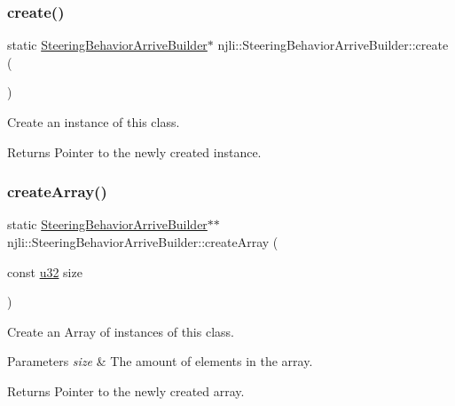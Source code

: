 \subsubsection{\texorpdfstring{create()}{create()}}
{\footnotesize\ttfamily static \mbox{\hyperlink{classnjli_1_1_steering_behavior_arrive_builder}{Steering\+Behavior\+Arrive\+Builder}}$\ast$ njli\+::\+Steering\+Behavior\+Arrive\+Builder\+::create (\begin{DoxyParamCaption}{ }\end{DoxyParamCaption})\hspace{0.3cm}{\ttfamily [static]}}

Create an instance of this class.

\begin{DoxyReturn}{Returns}
Pointer to the newly created instance. 
\end{DoxyReturn}
\mbox{\label{classnjli_1_1_steering_behavior_arrive_builder_a1e1038411d15323c3bc9e23d6aefe0c0}} 
\subsubsection{\texorpdfstring{create\+Array()}{createArray()}}
{\footnotesize\ttfamily static \mbox{\hyperlink{classnjli_1_1_steering_behavior_arrive_builder}{Steering\+Behavior\+Arrive\+Builder}}$\ast$$\ast$ njli\+::\+Steering\+Behavior\+Arrive\+Builder\+::create\+Array (\begin{DoxyParamCaption}\item[{const \mbox{\hyperlink{_util_8h_a10e94b422ef0c20dcdec20d31a1f5049}{u32}}}]{size }\end{DoxyParamCaption})\hspace{0.3cm}{\ttfamily [static]}}

Create an Array of instances of this class.


\begin{DoxyParams}{Parameters}
{\em size} & The amount of elements in the array.\\
\hline
\end{DoxyParams}
\begin{DoxyReturn}{Returns}
Pointer to the newly created array. 
\end{DoxyReturn}
\mbox{\label{classnjli_1_1_steering_behavior_arrive_builder_ae0eb9b506082b8038336ee76ddc02d28}} 
